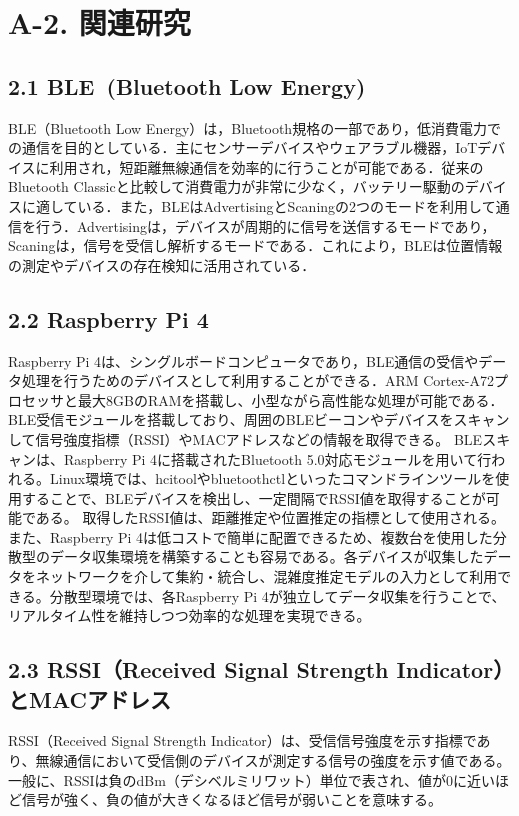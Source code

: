 \section*{A-2. 関連研究}

\subsection*{2.1 BLE\ (Bluetooth Low Energy)}
BLE（Bluetooth Low Energy）は，Bluetooth規格の一部であり，低消費電力での通信を目的としている．主にセンサーデバイスやウェアラブル機器，IoTデバイスに利用され，短距離無線通信を効率的に行うことが可能である．従来のBluetooth Classicと比較して消費電力が非常に少なく，バッテリー駆動のデバイスに適している．また，BLEはAdvertisingとScaningの2つのモードを利用して通信を行う．Advertisingは，デバイスが周期的に信号を送信するモードであり，Scaningは，信号を受信し解析するモードである．これにより，BLEは位置情報の測定やデバイスの存在検知に活用されている．

\subsection*{2.2 Raspberry Pi 4}
Raspberry Pi 4は、シングルボードコンピュータであり，BLE通信の受信やデータ処理を行うためのデバイスとして利用することができる．ARM Cortex-A72プロセッサと最大8GBのRAMを搭載し、小型ながら高性能な処理が可能である．BLE受信モジュールを搭載しており、周囲のBLEビーコンやデバイスをスキャンして信号強度指標（RSSI）やMACアドレスなどの情報を取得できる。
BLEスキャンは、Raspberry Pi 4に搭載されたBluetooth 5.0対応モジュールを用いて行われる。Linux環境では、hcitoolやbluetoothctlといったコマンドラインツールを使用することで、BLEデバイスを検出し、一定間隔でRSSI値を取得することが可能である。
取得したRSSI値は、距離推定や位置推定の指標として使用される。
また、Raspberry Pi 4は低コストで簡単に配置できるため、複数台を使用した分散型のデータ収集環境を構築することも容易である。各デバイスが収集したデータをネットワークを介して集約・統合し、混雑度推定モデルの入力として利用できる。分散型環境では、各Raspberry Pi 4が独立してデータ収集を行うことで、リアルタイム性を維持しつつ効率的な処理を実現できる。


\subsection*{2.3 RSSI（Received Signal Strength Indicator）とMACアドレス}
RSSI（Received Signal Strength Indicator）は、受信信号強度を示す指標であり、無線通信において受信側のデバイスが測定する信号の強度を示す値である。一般に、RSSIは負のdBm（デシベルミリワット）単位で表され、値が0に近いほど信号が強く、負の値が大きくなるほど信号が弱いことを意味する。

